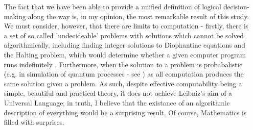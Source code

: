 \documentclass {article}
\begin{document}
The fact that we have been able to provide a unified definition of logical decision-making along the way is, in my opinion, the most remarkable result of this study. We must consider, however, that there are limits to computation - firstly, there is a set of so called 'undecideable' problems with solutions which cannot be solved algorithmically, including finding integer solutions to Diophantine equations \cite{matiyasevich1993hilbert} and the Halting problem, which would determine whether a given computer program runs indefinitely \cite{turing1936computablenumbers}. Furthermore, when the solution to a problem is probabalistic (e.g. in simulation of quantum processes - see \cite{feynman1982simulating}) as all computation produces the same solution given a problem. As such, despite effective computability being a simple, beautiful and practical theory, it does not achieve Leibniz's aim of a Universal Language; in truth, I believe that the existance of an algorithmic description of everything would be a surprising result. Of course, Mathematics is filled with surprises.





\end{document}
